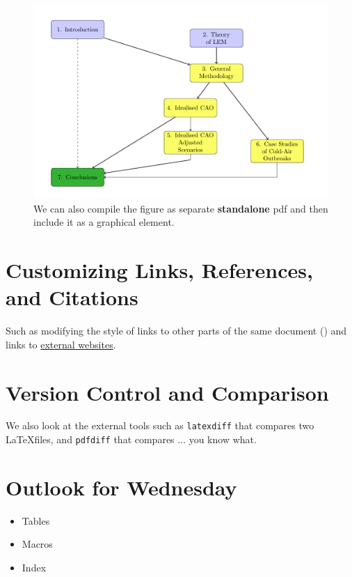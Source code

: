 \documentclass[a4paper,10pt]{report} %
\begin{document}
   \begin{figure}[!ht]
    \includegraphics[width=\textwidth]{./latex/standalone.pdf}
        \caption[Diagrams and plots]{We can also compile the figure as separate \textbf{standalone}  pdf and then include it as a graphical element. }  
      \label{fig:standalone}
 \end{figure}

 \newpage 
 
 \section{Customizing Links, References, and Citations}
 Such as modifying the style of links to other parts of the same document () and links to \href{https://geomet.uni-koeln.de/en/}{external websites}.
 
 
 \section{Version Control and Comparison}
 We also look at the external tools such as \texttt{latexdiff} that compares two \LaTeX files, and  \texttt{pdfdiff} that compares \( \ldots \) you know what.  
  



\section{Outlook for Wednesday}\label{sec:wednesday}

\begin{itemize}
 \item Tables
 \item Macros
 \item Index
\end{itemize}


 
\label{LastPage}
\newpage
\end{document}
